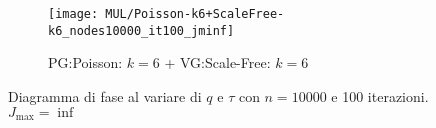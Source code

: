 \begin{figure}[H]
\begin{minipage}{\linewidth}
            \hspace{0.05\linewidth}
            \begin{minipage}{0.45\linewidth}
                \begin{figure}
                    \texttt{[image: MUL/Poisson-k6+ScaleFree-k6\_nodes10000\_it100\_jminf]}\caption{PG:Poisson: $k=6$ + VG:Scale-Free: $k=6$}
                    \label{fig:mul_poisson_k_6_scale_free_k_6_nodes_10000}
                \end{figure}
            \end{minipage}
            \caption{Diagramma di fase al variare di $q$ e $\tau$ con $n=10000$ e 100 iterazioni. $J_{\max}=\inf$}
        \end{minipage}
    \end{figure}

